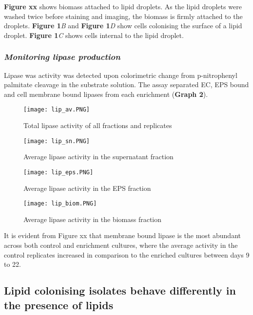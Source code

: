 \documentclass[11pt]{article}
\begin{document}
\textbf{Figure xx } shows biomass attached to lipid droplets. As the lipid droplets were washed twice before staining and imaging, the biomass is firmly attached to the droplets. \textbf{Figure 1}\textit{B} and \textbf{Figure 1}\textit{D} show cells colonising the surface of a lipid droplet. \textbf{Figure 1}\textit{C} shows cells internal to the lipid droplet.

\subsubsection{\emph{Monitoring lipase production}}
Lipase was activity was detected upon colorimetric change from p-nitrophenyl palmitate cleavage in the substrate solution. The assay separated  EC, EPS bound and cell membrane bound lipases from each enrichment (\textbf{Graph 2}).

\begin{figure}
\texttt{[image: lip\_av.PNG]}
\caption{Total lipase activity of all fractions and replicates}
\end{figure}

\begin{figure}
\texttt{[image: lip\_sn.PNG]}
\caption{Average lipase activity in the supernatant fraction}
\end{figure}

\begin{figure}
\texttt{[image: lip\_eps.PNG]}
\caption{Average lipase activity in the EPS fraction}
\end{figure}

\begin{figure}
\texttt{[image: lip\_biom.PNG]}
\caption{Average lipase activity in the biomass fraction}
\end{figure}



It is evident from  Figure xx that membrane bound lipase is the most abundant across both control and enrichment cultures, where the average activity in the control replicates increased in comparison to the enriched cultures between days 9 to 22.

\subsection{Lipid colonising isolates behave differently in the presence of lipids}
\end{document}
